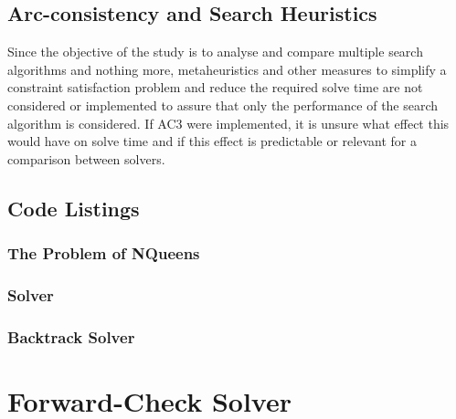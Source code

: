 \documentclass{article}
\begin{document}
\subsection*{Arc-consistency and Search Heuristics}
Since the objective of the study is to analyse and compare multiple search algorithms and nothing more, metaheuristics and other measures to simplify a constraint satisfaction problem and reduce the required solve time are not considered or implemented to assure that only the performance of the search algorithm is considered. If AC3 were implemented, it is unsure what effect this would have on solve time and if this effect is predictable or relevant for a comparison between solvers.

\subsection*{Code Listings}
\subsubsection*{The Problem of NQueens}
%

\subsubsection*{Solver}
%
%
\subsubsection*{Backtrack Solver}
%

\section*{Forward-Check Solver}
\end{document}
